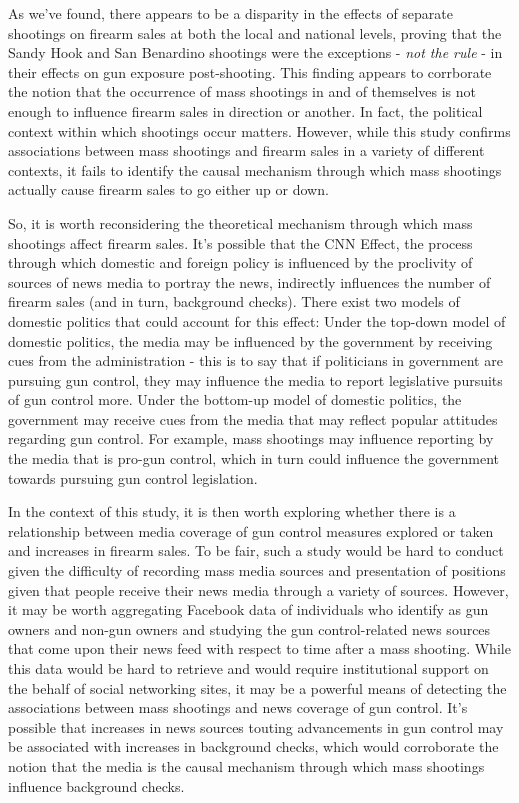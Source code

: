 \documentclass[9pt,twocolumn,twoside,lineno]{pnas-new}
\begin{document}
As we've found, there appears to be a disparity in the effects of separate shootings on firearm sales at both the local and national levels, proving that the Sandy Hook and San Benardino shootings were the exceptions - \textit{not the rule} - in their effects on gun exposure post-shooting. This finding appears to corrborate the notion that the occurrence of mass shootings in and of themselves is not enough to influence firearm sales in direction or another. In fact, the political context within which shootings occur matters. However, while this study confirms associations between mass shootings and firearm sales in a variety of different contexts, it fails to identify the causal mechanism through which mass shootings actually cause firearm sales to go either up or down. 

So, it is worth reconsidering the theoretical mechanism through which mass shootings affect firearm sales. It's possible that the CNN Effect, the process through which domestic and foreign policy is influenced by the proclivity of sources of news media to portray the news, indirectly influences the number of firearm sales (and in turn, background checks). There exist two models of domestic politics that could account for this effect: Under the top-down model of domestic politics, the media may be influenced by the government by receiving cues from the administration - this is to say that if politicians in government are pursuing gun control, they may influence the media to report legislative pursuits of gun control more. Under the bottom-up model of domestic politics, the government may receive cues from the media that may reflect popular attitudes regarding gun control. For example, mass shootings may influence reporting by the media that is pro-gun control, which in turn could influence the government towards pursuing gun control legislation.

In the context of this study, it is then worth exploring whether there is a relationship between media coverage of gun control measures explored or taken and increases in firearm sales. To be fair, such a study would be hard to conduct given the difficulty of recording mass media sources and presentation of positions given that people receive their news media through a variety of sources. However, it may be worth aggregating Facebook data of individuals who identify as gun owners and non-gun owners and studying the gun control-related news sources that come upon their news feed with respect to time after a mass shooting. While this data would be hard to retrieve and would require institutional support on the behalf of social networking sites, it may be a powerful means of detecting the associations between mass shootings and news coverage of gun control. It's possible that increases in news sources touting advancements in gun control may be associated with increases in background checks, which would corroborate the notion that the media is the causal mechanism through which mass shootings influence background checks. 
\end{document}
